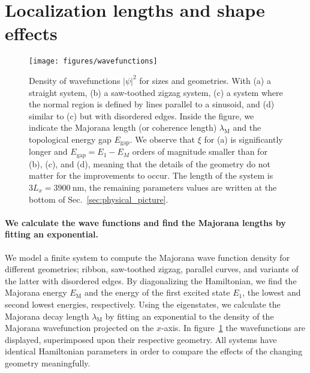 \documentclass[english, twocolumn, 10pt, aps, superscriptaddress, floatfix, prb, citeautoscript]{revtex4-1}
\renewcommand{\comment}[2]{#2}
\renewcommand{\comment}{\paragraph}
\begin{document}

\section{Localization lengths and shape effects}\label{sec:shape_effects}

\begin{figure}[!htb]
\texttt{[image: figures/wavefunctions]}
\caption{Density of wavefunctions $\left|\psi\right|^2$ for sizes and geometries.
With (a) a straight system, (b) a saw-toothed zigzag system, (c) a system where the normal region is defined by lines parallel to a sinusoid, and (d) similar to (c) but with disordered edges.
Inside the figure, we indicate the Majorana length (or coherence length) $\lambda_\textrm{M}$ and the topological energy gap $E_\textrm{gap}$.
We observe that $\xi$ for (a) is significantly longer and $E_\textrm{gap} = E_\textrm{1} - E_M$ orders of magnitude smaller than for (b), (c), and (d), meaning that the details of the geometry do not matter for the improvements to occur.
The length of the system is $3L_x=\SI{3900}{\nm}$, the remaining parameters values are written at the bottom of Sec.~\ref{sec:physical_picture}.\label{fig:wavefunctions}}
\end{figure}

\comment{We calculate the wave functions and find the Majorana lengths by fitting an exponential.}
We model a finite system to compute the Majorana wave function density for different geometries; ribbon, saw-toothed zigzag, parallel curves, and variants of the latter with disordered edges.
By diagonalizing the Hamiltonian, we find the Majorana energy $E_\textrm{M}$ and the energy of the first excited state $E_1$, the lowest and second lowest energies, respectively.
Using the eigenstates, we calculate the Majorana decay length $\lambda_\textrm{M}$ by fitting an exponential to the density of the Majorana wavefunction projected on the $x$-axis.
In figure~\ref{fig:wavefunctions} the wavefunctions are displayed, superimposed upon their respective geometry.
All systems have identical Hamiltonian parameters in order to compare the effects of the changing geometry meaningfully.
\end{document}
